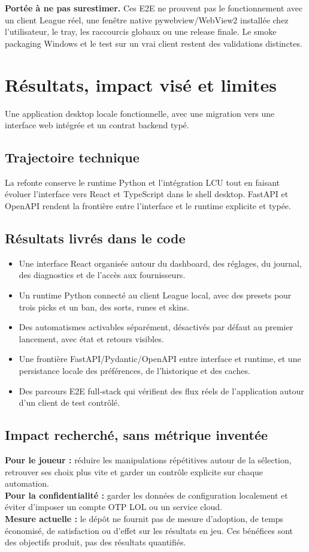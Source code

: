 \documentclass[10pt,a4paper]{article}
\newcommand{\tagline}[1]{{\large\color{muted}#1}}
\newcommand{\softbox}[1]{%
  \colorbox{panel}{\parbox{0.96\linewidth}{\vspace{5pt}#1\vspace{5pt}}}}
\begin{document}
\softbox{\textbf{Portée à ne pas surestimer.} Ces E2E ne prouvent pas le fonctionnement avec un client League réel, une fenêtre native pywebview/WebView2 installée chez l'utilisateur, le tray, les raccourcis globaux ou une release finale. Le smoke packaging Windows et le test sur un vrai client restent des validations distinctes.}
\newpage

\section*{Résultats, impact visé et limites}
\tagline{Une application desktop locale fonctionnelle, avec une migration vers une interface web intégrée et un contrat backend typé.}

\subsection*{Trajectoire technique}
La refonte conserve le runtime Python et l'intégration LCU tout en faisant évoluer l'interface vers React et TypeScript dans le shell desktop. FastAPI et OpenAPI rendent la frontière entre l'interface et le runtime explicite et typée.

\subsection*{Résultats livrés dans le code}
\begin{itemize}
  \item Une interface React organisée autour du dashboard, des réglages, du journal, des diagnostics et de l'accès aux fournisseurs.
  \item Un runtime Python connecté au client League local, avec des presets pour trois picks et un ban, des sorts, runes et skins.
  \item Des automatismes activables séparément, désactivés par défaut au premier lancement, avec état et retours visibles.
  \item Une frontière FastAPI/Pydantic/OpenAPI entre interface et runtime, et une persistance locale des préférences, de l'historique et des caches.
  \item Des parcours E2E full-stack qui vérifient des flux réels de l'application autour d'un client de test contrôlé.
\end{itemize}

\subsection*{Impact recherché, sans métrique inventée}
\softbox{\textbf{Pour le joueur :} réduire les manipulations répétitives autour de la sélection, retrouver ses choix plus vite et garder un contrôle explicite sur chaque automation.\\
\textbf{Pour la confidentialité :} garder les données de configuration localement et éviter d'imposer un compte OTP LOL ou un service cloud.\\
\textbf{Mesure actuelle :} le dépôt ne fournit pas de mesure d'adoption, de temps économisé, de satisfaction ou d'effet sur les résultats en jeu. Ces bénéfices sont des objectifs produit, pas des résultats quantifiés.}
\end{document}
